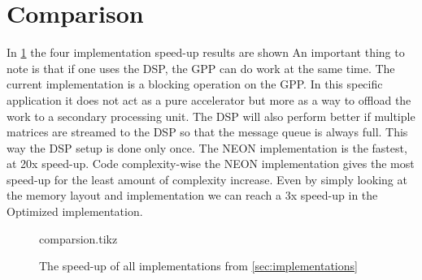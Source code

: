\documentclass[final]{article}
\begin{document}
\section{Comparison}
\label{sec:comparison}
In \cref{fig:comparison} the four implementation speed-up results are shown
An important thing to note is that if one uses the DSP, the GPP can do work at the same time.
The current implementation is a blocking operation on the GPP.
In this specific application it does not act as a pure accelerator but more as a way to offload the work to a secondary processing unit.
The DSP will also perform better if multiple matrices are streamed to the DSP so that the message queue is always full.
This way the DSP setup is done only once.
The NEON implementation is the fastest, at 20x speed-up. %
Code complexity-wise the NEON implementation gives the most speed-up for the least amount of complexity increase.
Even by simply looking at the memory layout and implementation we can reach a 3x speed-up in the Optimized implementation.

\begin{figure}
\centering
\setlength\figureheight{8cm}
\setlength\figurewidth{\linewidth}
{comparsion.tikz}
\caption{The speed-up of all implementations from \cref{sec:implementations}}
\label{fig:comparison}
\end{figure}
\end{document}
